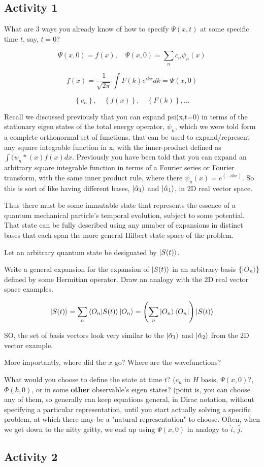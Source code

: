 \documentclass{article}
\begin{document}
\subsection{Activity 1}

What are 3 ways you already know of how to specify $\Psi(x,t)$ at some specific time $t$, say, $t = 0$?

$$\Psi(x,0) = f(x), \quad \Psi(x,0) = \sum_n c_n \psi_n(x)$$

$$f(x) = \frac{1}{\sqrt{2 \pi}} \int F(k) e^{ikx} dk = \Psi(x,0)$$

$$\left\{ c_n \right\}, \quad \left\{ f(x) \right\}, \quad \left\{ F(k) \right\}, ...$$


Recall we discussed previously that you can expand psi(x,t=0) in terms of the stationary eigen states of the total energy operator, $\psi_n$, which we were told form a complete orthonormal set of functions, that can be used to expand/represent any square integrable function in x, with the inner-product defined as $\int (\psi_n*(x) f(x) dx$.   Previously you have been told that you can expand an arbitrary square integrable function in terms of a Fourier series or Fourier transform, with the same inner product rule, where there $\psi_n(x)=e^(-ikx)$.  So this is sort of like having different bases, $\ket{\hat{\alpha}_1}$  and $\ket{\hat{\alpha}_1}$, in 2D real vector space. 

\hfill

Thus there must be some immutable state that represents the essence of a quantum mechanical particle’s temporal evolution, subject to some potential.  That state can be fully described using any number of expansions in distinct bases that each span the more general Hilbert state space of the problem. 

Let an arbitrary quantum state be designated by $\ket{S(t)}$. 

Write a general expansion for the expansion of $\ket{S(t)}$ in an arbitrary basis $\left\{ \ket{O_n} \right\}$ defined by some Hermitian operator. Draw an analogy with the 2D real vector space examples. 

$$\ket{S(t)} = \sum_n \braket{O_n | S(t)} \ket{O_n} = \left( \sum_n \ket{O_n} \bra{O_n} \right) \ket{S(t)}$$

SO, the set of basis vectors look very similar to the $\ket{\hat{\alpha}_1}$ and $\ket{\hat{\alpha}_2}$ from the 2D vector example. 

More importantly, where did the $x$ go? Where are the wavefunctions?

What would you choose to define the state at time $t$? ($c_n$ in $H$ basis, $\Psi(x,0)$?, $\Phi(k,0)$, or in some \textbf{other} observable's eigen states? (point is, you can choose any of them, so generally can keep equations general, in Dirac notation, without specifying a particular representation, until you start actually solving a specific problem, at which there may be a "natural representation" to choose. Often, when we get down to the nitty gritty, we end up using $\Psi(x,0)$ in analogy to $\hat{i}$, $\hat{j}$. 

\subsection{Activity 2}
\end{document}
